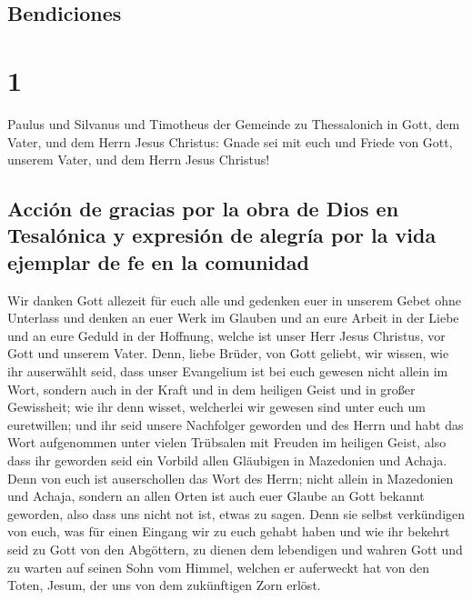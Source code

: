 \hypertarget{bendiciones}{%
\subsection{Bendiciones}\label{bendiciones}}

\hypertarget{section}{%
\section{1}\label{section}}

 Paulus und Silvanus und Timotheus der Gemeinde zu
Thessalonich in Gott, dem Vater, und dem Herrn Jesus Christus: Gnade sei
mit euch und Friede von Gott, unserem Vater, und dem Herrn Jesus
Christus!

\hypertarget{acciuxf3n-de-gracias-por-la-obra-de-dios-en-tesaluxf3nica-y-expresiuxf3n-de-alegruxeda-por-la-vida-ejemplar-de-fe-en-la-comunidad}{%
\subsection{Acción de gracias por la obra de Dios en Tesalónica y
expresión de alegría por la vida ejemplar de fe en la
comunidad}\label{acciuxf3n-de-gracias-por-la-obra-de-dios-en-tesaluxf3nica-y-expresiuxf3n-de-alegruxeda-por-la-vida-ejemplar-de-fe-en-la-comunidad}}

 Wir danken Gott allezeit für euch alle und gedenken euer
in unserem Gebet ohne Unterlass  und denken an euer Werk
im Glauben und an eure Arbeit in der Liebe und an eure Geduld in der
Hoffnung, welche ist unser Herr Jesus Christus, vor Gott und unserem
Vater.  Denn, liebe Brüder, von Gott geliebt, wir wissen,
wie ihr auserwählt seid,  dass unser Evangelium ist bei
euch gewesen nicht allein im Wort, sondern auch in der Kraft und in dem
heiligen Geist und in großer Gewissheit; wie ihr denn wisset, welcherlei
wir gewesen sind unter euch um euretwillen;  und ihr seid
unsere Nachfolger geworden und des Herrn und habt das Wort aufgenommen
unter vielen Trübsalen mit Freuden im heiligen Geist, 
also dass ihr geworden seid ein Vorbild allen Gläubigen in Mazedonien
und Achaja.  Denn von euch ist auserschollen das Wort des
Herrn; nicht allein in Mazedonien und Achaja, sondern an allen Orten ist
auch euer Glaube an Gott bekannt geworden, also dass uns nicht not ist,
etwas zu sagen.  Denn sie selbst verkündigen von euch, was
für einen Eingang wir zu euch gehabt haben und wie ihr bekehrt seid zu
Gott von den Abgöttern, zu dienen dem lebendigen und wahren Gott
 und zu warten auf seinen Sohn vom Himmel, welchen er
auferweckt hat von den Toten, Jesum, der uns von dem zukünftigen Zorn
erlöst.


